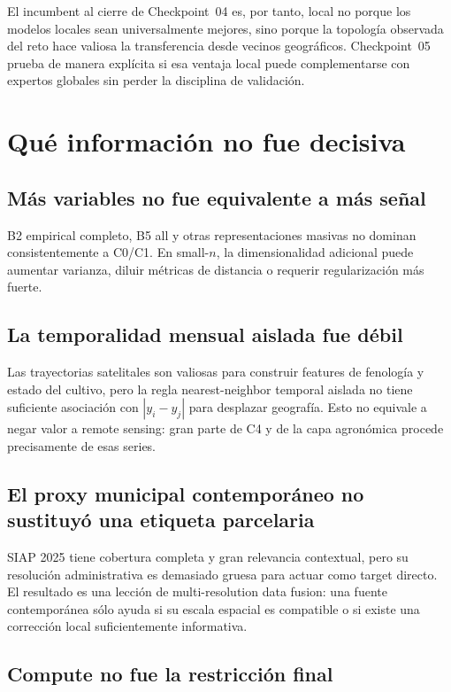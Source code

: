 El incumbent al cierre de Checkpoint~04 es, por tanto, local no porque los modelos locales
sean universalmente mejores, sino porque la topología observada del reto hace valiosa la
transferencia desde vecinos geográficos. Checkpoint~05 prueba de manera explícita si esa
ventaja local puede complementarse con expertos globales sin perder la disciplina de
validación.

\section{Qué información no fue decisiva}

\subsection{Más variables no fue equivalente a más señal}

B2 empirical completo, B5 all y otras representaciones masivas no dominan consistentemente a
C0/C1. En small-$n$, la dimensionalidad adicional puede aumentar varianza, diluir métricas de
distancia o requerir regularización más fuerte.

\subsection{La temporalidad mensual aislada fue débil}

Las trayectorias satelitales son valiosas para construir features de fenología y estado del
cultivo, pero la regla nearest-neighbor temporal aislada no tiene suficiente asociación con
$|y_i-y_j|$ para desplazar geografía. Esto no equivale a negar valor a remote sensing:
gran parte de C4 y de la capa agronómica procede precisamente de esas series.

\subsection{El proxy municipal contemporáneo no sustituyó una etiqueta parcelaria}

SIAP 2025 tiene cobertura completa y gran relevancia contextual, pero su resolución
administrativa es demasiado gruesa para actuar como target directo. El resultado es una
lección de multi-resolution data fusion: una fuente contemporánea sólo ayuda si su escala
espacial es compatible o si existe una corrección local suficientemente informativa.

\subsection{Compute no fue la restricción final}

